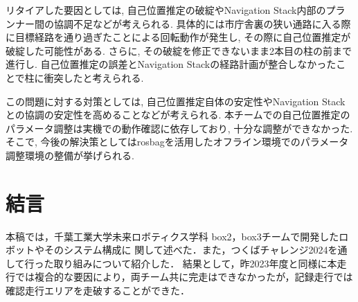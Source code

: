 \documentclass[twocolumn, 9pt]{jsproceedings}
\begin{document}
リタイアした要因としては, 自己位置推定の破綻やNavigation Stack内部のプランナー間の協調不足などが考えられる.
具体的には市庁舎裏の狭い通路に入る際に目標経路を通り過ぎたことによる回転動作が発生し,
その際に自己位置推定が破綻した可能性がある.
さらに, その破綻を修正できないまま2本目の柱の前まで進行し.
自己位置推定の誤差とNavigation Stackの経路計画が整合しなかったことで柱に衝突したと考えられる.

この問題に対する対策としては, 自己位置推定自体の安定性やNavigation Stackとの協調の安定性を高めることなどが考えられる.
本チームでの自己位置推定のパラメータ調整は実機での動作確認に依存しており, 十分な調整ができなかった.
そこで, 今後の解決策としてはrosbagを活用したオフライン環境でのパラメータ調整環境の整備が挙げられる.






\section{結言}
本稿では，千葉工業大学未来ロボティクス学科 box2，box3チームで開発したロボットやそのシステム構成に
関して述べた．また，つくばチャレンジ2024を通して行った取り組みについて紹介した．
結果として，昨2023年度と同様に本走行では複合的な要因により，両チーム共に完走はできなかったが，記録走行では
確認走行エリアを走破することができた．
\end{document}
